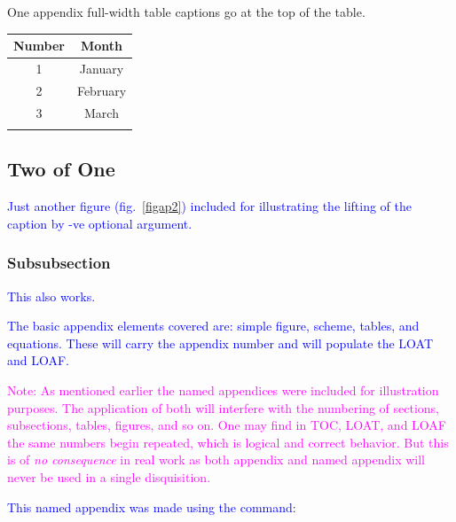 \documentclass[phd]{ndsu-thesis-2022}
\newcommand\italk[1]{\textcolor{blue}{#1}}  %
\begin{document}
\begin{appendixtable}[ht]
\centering
\caption{One appendix full-width table captions go at the top of the table.}
\setlength\tabcolsep{1.3in}
\begin{tabular}{cc}
\toprule
Number & Month \\
\midrule
1 & January \\
2 & February \\
3 & March\\
\bottomrule
\label{aptab1}
\end{tabular}
\end{appendixtable}

\subsection{Two of One}

\italk{Just another figure (fig.~\ref{figap2}) included for illustrating the lifting of the caption by -ve optional argument. }


\subsubsection{Subsubsection}
\italk{This also works.}


\italk{The basic appendix elements covered are: simple figure, scheme, tables, and equations. These will carry the appendix number and will populate the LOAT and LOAF.}

\textcolor{magenta}{Note: As mentioned earlier the named appendices were included for illustration purposes. The application of both will interfere with the numbering of sections, subsections, tables, figures, and so on. One may find in TOC, LOAT, and LOAF the same numbers begin repeated, which is logical and correct behavior. But this is of \emph{no consequence} in real work as both appendix and named appendix will never be used in a single disquisition.}

\italk{This named appendix was made using the command:}
\end{document}
